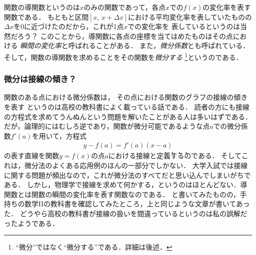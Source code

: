 関数の導関数というのは$x$のみの関数であって，各点$x$での$f(x)$の変化率を表す関数である．
もともと区間$[x, \, x+\varDelta x]$における平均変化率を表していたものの$\varDelta x$を0に近づけたのだから，これが1点$x$での変化率を
表しているというのは当然だろう？ このことから，導関数に各点の座標を当てはめたものはその点における
\emph{瞬間の変化率}と呼ばれることがある．
また，\emph{微分係数}とも呼ばれている．
そして，関数の導関数を求めることをその関数を\emph{微分する}
\footnote{``微分''ではなく``微分する''である．詳細は後述．}というのである．
\subsubsection{微分は接線の傾き？}
関数のある点における微分係数は，
その点における関数のグラフの接線の傾きを表す
というのは高校の教科書によく載っている話である．
読者の方にも接線の方程式を求めてうんぬんという問題を解いたことがある人は多いはずである．
だが，論理的にはむしろ逆であり，関数が微分可能であるような点$a$での微分係数$f'(a)$を用いて，方程式
\begin{align}
y-f(a) = f'(a)(x-a)
\label{eq:sessen}
\end{align}
の表す直線を関数$y=f(x)$の点$a$における接線と\.定\.義\.す\.るのである．
そしてこれは，微分法のよくある応用例のほんの一部分でしかない．
大学入試では接線に関する問題が頻出なので，これが微分法のすべてだと思い込んでしまいがちである．
しかし，物理学で接線を求めて何かする，というのはほとんどない．導関数とは関数の瞬間の変化率を表す関数なのである．
と書いてみたものの，手持ちの数学I\hspace{-,1em}Iの教科書を確認してみたところ，上と同じような文章が書いてあった．
どうやら高校の教科書が接線の扱いを間違っているというのは私の誤解だったようである．
